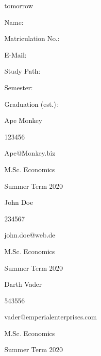 \documentclass[11pt,a4paper]{article}
\begin{document}
\begin{titlepage}
  \noindent\begin{minipage}[t]{0.3\textwidth}
  \end{minipage}
  \begin{minipage}[t]{0.7\textwidth}
  \hspace{1cm}
  \end{minipage}

  \noindent\begin{minipage}[t]{0.3\textwidth}
  \end{minipage}
  \begin{minipage}[t]{0.7\textwidth}
  \hspace{1cm}tomorrow
  \end{minipage}

  \hrulefill

  \begin{multicols}{3}

  Name:

  Matriculation No.:

  E-Mail:

  Study Path:

  Semester:

  Graduation (est.):

  \columnbreak

  Ape Monkey

  123456

  Ape@Monkey.biz

  M.Sc. Economics


  Summer Term 2020

  \columnbreak

  John Doe

  234567

  john.doe@web.de

  M.Sc. Economics


  Summer Term 2020

  \columnbreak

  Darth Vader

  543556

  vader@emperialenterprises.com

  M.Sc. Economics


  Summer Term 2020

  \end{multicols}

\end{titlepage}
\end{document}
